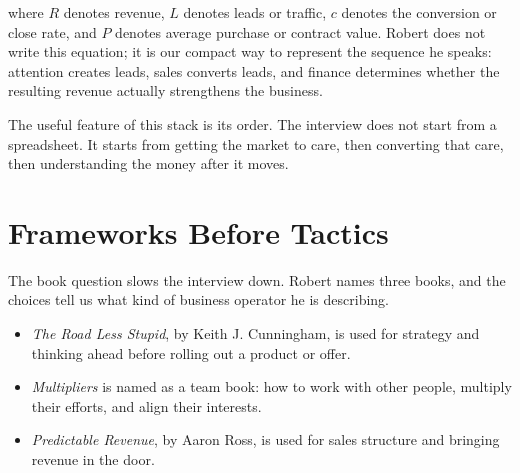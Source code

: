 where \(R\) denotes revenue, \(L\) denotes leads or traffic, \(c\) denotes the conversion or close rate, and \(P\) denotes average purchase or contract value. Robert does not write this equation; it is our compact way to represent the sequence he speaks: attention creates leads, sales converts leads, and finance determines whether the resulting revenue actually strengthens the business.

\begin{figure}
\centering
{}
\end{figure}

The useful feature of this stack is its order. The interview does not start from a spreadsheet. It starts from getting the market to care, then converting that care, then understanding the money after it moves.

\section{Frameworks Before Tactics}

The book question slows the interview down. Robert names three books, and the choices tell us what kind of business operator he is describing.

\begin{itemize}
\item \emph{The Road Less Stupid}, by Keith J. Cunningham, is used for strategy and thinking ahead before rolling out a product or offer.
\item \emph{Multipliers} is named as a team book: how to work with other people, multiply their efforts, and align their interests.
\item \emph{Predictable Revenue}, by Aaron Ross, is used for sales structure and bringing revenue in the door.
\end{itemize}

